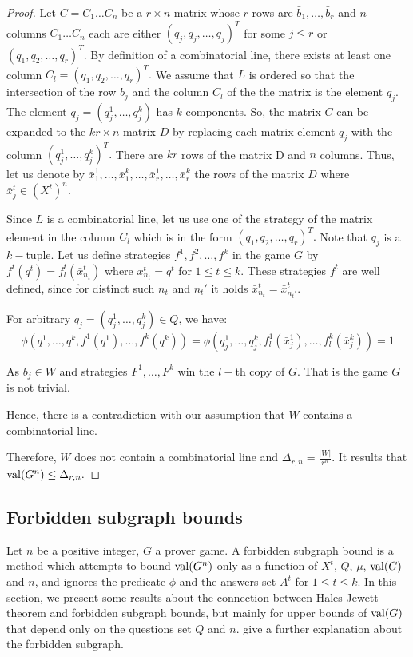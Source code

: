 \begin{proof}
Let $C=C_1\ldots C_n$ be a $r \times n$ matrix whose $r$ rows are $\bar{b}_1, \ldots, \bar{b}_r$ and $n$ columns $C_1\ldots C_n$ each are either $(q_j,q_j,\ldots,q_j)^T$ for some $j\leq r$ or $(q_1,q_2,\ldots,q_r)^T.$ By definition of a combinatorial line, there exists at least one column $C_l=(q_1,q_2,\ldots,q_r)^T.$ We assume that $L$ is ordered so that the intersection of the row $\bar{b}_j$ and the column $C_l$ of the the matrix is the element $q_j.$ The element $q_j=(q_j^1,\ldots, q_j^k)$ has $k$ components. So, the  matrix $C$ can be expanded to the $kr \times n$ matrix $D$ by replacing each matrix element $q_j$ with the column $(q_j^1,\ldots, q_j^k)^T.$ There are $kr$ rows of the matrix D and $n$ columns. Thus, let us denote by $\bar{x}_1^1, \ldots, \bar{x}_1^k, \ldots, \bar{x}_r^1, \ldots, \bar{x}_r^k$ the rows of the matrix $D$ where $\bar{x}_j^t \in  (X^t)^n.$

Since $L$ is a combinatorial line, let us use one of the strategy of the matrix element in the column $C_l$ which is in the form $(q_1,q_2,\ldots,q_r)^T.$  Note that $q_j$ is a $k-$tuple. 
Let us define strategies $f^1,f^2, \ldots, f^k$ in the game $G$ by $f^t(q^t)=f_l^t(\bar{x}_{n_t}^t)$ where $x_{n_t}^t=q^t$ for $1\leq t \leq k.$ These strategies $f^t$ are well defined, since for distinct such $n_t$ and $n_t'$ it holds $\bar{x}_{n_t}^t= \bar{x}_{n_t'}^t.$ 

For  arbitrary $q_j= (q_j^1,\ldots, q_j^k) \in Q$, we have:
$$\phi (q^1,\ldots, q^k, f^1(q^1), \ldots, f^k(q^k))= \phi (q_j^1,\ldots, q_j^k, f_l^1(\bar{x}_j^1), \ldots, f_l^k(\bar{x}_j^k))=1$$

As $b_j \in W$ and strategies $F^1, \ldots, F^k$ win the $l-$th copy of $G$. That is the game $G$ is not trivial. 

Hence, there is a contradiction with our assumption that $W$ contains a combinatorial line.

Therefore, $W$ does not contain a combinatorial line and $\Delta_{r,n}= \frac{|W|}{r^n}$.
It results that $\mathrm{val} (G^n) \leq \Delta_{r,n}.$
\end{proof}
 

\subsection{Forbidden subgraph bounds}
 
Let $n$ be a positive integer, $G$ a prover game. A forbidden subgraph bound is a method which attempts  to  bound $\mathrm{val} (G^n)$ only as a function of $X^t$, $Q$, $\mu$, $\mathrm{val} (G)$ and $n$, and ignores the predicate $\phi$ and the answers set $A^t$ for $1\leq t \leq k.$ In this section, we present some results about the connection between Hales-Jewett theorem and forbidden subgraph bounds, but mainly for upper bounds of $\mathrm{val} (G)$ that depend only on the questions set $Q$ and $n.$ \cite{feige1996error} give a further explanation about the forbidden subgraph.


